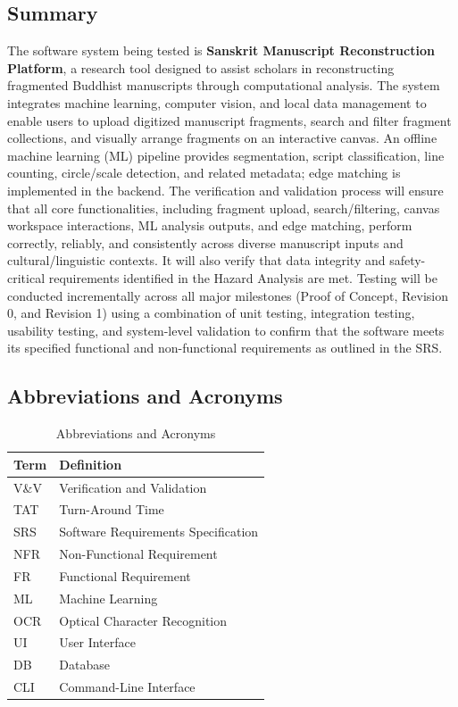\documentclass[12pt, titlepage]{article}
\begin{document}
\subsection{Summary}
The software system being tested is \textbf{Sanskrit Manuscript Reconstruction Platform}, a research tool designed to assist scholars in reconstructing fragmented Buddhist manuscripts through computational analysis. The system integrates machine learning, computer vision, and local data management to enable users to upload digitized manuscript fragments, search and filter fragment collections, and visually arrange fragments on an interactive canvas. An offline machine learning (ML) pipeline provides segmentation, script classification, line counting, circle/scale detection, and related metadata; edge matching is implemented in the backend.
\newline
The verification and validation process will ensure that all core functionalities, including fragment upload, search/filtering, canvas workspace interactions, ML analysis outputs, and edge matching, perform correctly, reliably, and consistently across diverse manuscript inputs and cultural/linguistic contexts. It will also verify that data integrity and safety-critical requirements identified in the Hazard Analysis are met.
\newline
Testing will be conducted incrementally across all major milestones (Proof of Concept, Revision 0, and Revision 1) using a combination of unit testing, integration testing, usability testing, and system-level validation to confirm that the software meets its specified functional and non-functional requirements as outlined in the SRS.

\newpage

\subsection{Abbreviations and Acronyms}

\begin{table}[h]
\centering
\caption{Abbreviations and Acronyms}
\begin{tabular}{ll}
\toprule
\textbf{Term} & \textbf{Definition} \\
\midrule
V\&V & Verification and Validation \\
TAT & Turn-Around Time \\
SRS & Software Requirements Specification \\
NFR & Non-Functional Requirement \\
FR & Functional Requirement \\
ML & Machine Learning \\
OCR & Optical Character Recognition \\
UI & User Interface \\
DB & Database \\
CLI & Command-Line Interface \\
\bottomrule
\end{tabular}
\end{table}
  
\end{document}
